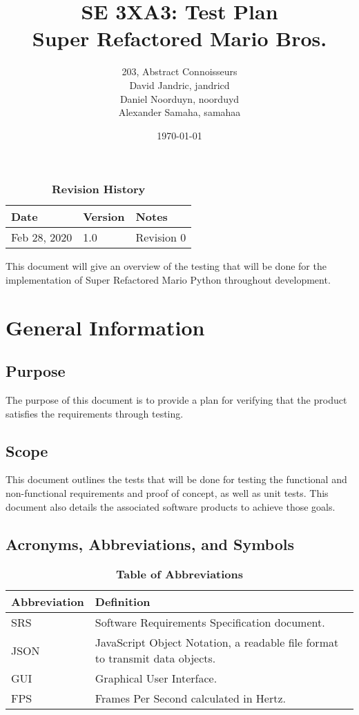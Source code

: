\documentclass[12pt, titlepage]{article}
\title{SE 3XA3: Test Plan\\Super Refactored Mario Bros.}
\author{203, Abstract Connoisseurs
		\\ David Jandric, jandricd
		\\ Daniel Noorduyn, noorduyd
		\\ Alexander Samaha, samahaa
}
\date{\today}
\begin{document}
\maketitle

\tableofcontents
\listoftables
\listoffigures

\begin{table}[H]
\caption{\bf Revision History}
\begin{tabularx}{\textwidth}{p{3cm}p{2cm}X}
\toprule {\bf Date} & {\bf Version} & {\bf Notes}\\
\midrule
Feb 28, 2020 & 1.0 & Revision 0\\
\bottomrule
\end{tabularx}
\end{table}

\newpage


This document will give an overview of the testing that will be done for the implementation of Super
Refactored Mario Python throughout development. 



\section{General Information}

\subsection{Purpose}
The purpose of this document is to provide a plan for verifying that the product
satisfies the requirements through testing.



\subsection{Scope}
This document outlines the tests that will be done for testing the functional and non-functional requirements and proof of concept, as well as unit tests. This document also details the associated software products to achieve those goals.



\subsection{Acronyms, Abbreviations, and Symbols}
\begin{table}[hbp]
\caption{\textbf{Table of Abbreviations}} \label{Table}
\begin{tabularx}{\textwidth}{p{3cm}X}
\toprule
\textbf{Abbreviation} & \textbf{Definition} \\
\midrule
SRS & Software Requirements Specification document.\\
JSON & JavaScript Object Notation, a readable file format to transmit data objects.\\
GUI & Graphical User Interface.\\
FPS & Frames Per Second calculated in Hertz.\\
\bottomrule
\end{tabularx}
\end{table}
\end{document}
